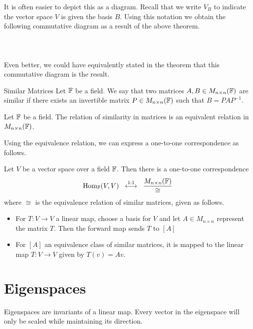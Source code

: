\documentclass[a4paper]{article}
\begin{document}
It is often easier to depict this as a diagram. Recall that we write $V_B$ to indicate the vector space $V$ is given the basis $B$. Using this notation we obtain the following commutative diagram as a result of the above theorem. \\~\\
\\~\\
Even better, we could have equivalently stated in the theorem that this commutative diagram is the result. 

\begin{defn}{Similar Matrices}{} Let $\mathbb{F}$ be a field. We say that two matrices $A,B\in M_{n\times n}(\mathbb{F})$ are similar if there exists an invertible matrix $P\in M_{n\times n}(\mathbb{F})$ such that $B=PAP^{-1}$. 
\end{defn}

\begin{lmm}{}{} Let $\mathbb{F}$ be a field. The relation of similarity in matrices is an equivalent relation in $M_{n\times n}(\mathbb{F})$. 
\end{lmm}

Using the equivalence relation, we can express a one-to-one correspondence as follows. 

\begin{thm}{}{} Let $V$ be a vector space over a field $\mathbb{F}$. Then there is a one-to-one correspondence $$\operatorname{Hom}_{\mathbb{F}}(V,V)\;\;\overset{1:1}{\longleftrightarrow}\;\;\frac{M_{n\times n}(\mathbb{F})}{\cong}$$ where $\cong$ is the equivalence relation of similar matrices, given as follows. 
\begin{itemize}
\item For $T:V\to V$ a linear map, choose a basis for $V$ and let $A\in M_{n\times n}$ represent the matrix $T$. Then the forward map sends $T$ to $[A]$
\item For $[A]$ an equivalence class of similar matrices, it is mapped to the linear map $T:V\to V$ given by $T(v)=Av$. 
\end{itemize}
\end{thm}

\pagebreak
\section{Eigenspaces}
Eigenspaces are invariants of a linear map. Every vector in the eigenspace will only be scaled while maintaining its direction. 
\end{document}
